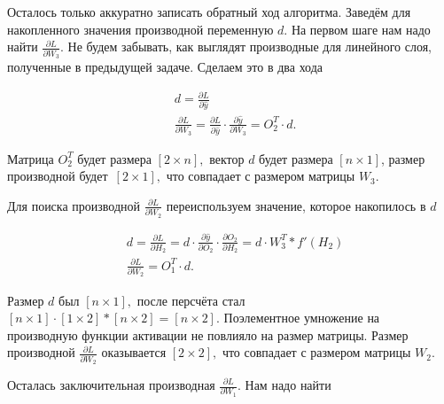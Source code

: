 \begin{sol}
\begin{center}
\end{center}

Осталось только аккуратно записать обратный ход алгоритма. Заведём для накопленного значения производной переменную $d$. На первом шаге нам надо найти $\frac{\partial L}{\partial W_3}$. Не будем забывать, как выглядят производные для линейного слоя, полученные в предыдущей задаче. Сделаем это в два хода

\begin{equation*} 
	\begin{aligned}
		&  d = \frac{\partial L}{\partial \hat y} \\
		&  \frac{\partial L}{\partial W_3} = \frac{\partial L}{\partial \hat y} \cdot \frac{\partial \hat y}{\partial W_3} = O_2^T \cdot d.
	\end{aligned}
\end{equation*}

Матрица $O_2^T$ будет размера $[2 \times n],$ вектор $d$ будет размера $[n \times 1]$, размер производной будет~$[2 \times 1],$ что совпадает с размером матрицы $W_3.$

Для поиска производной $\frac{\partial L}{\partial W_2}$ переиспользуем значение, которое накопилось в $d$

\begin{equation*} 
	\begin{aligned}
		&  d = \frac{\partial L}{\partial H_2} = d \cdot \frac{\partial \hat y}{\partial O_2} \cdot \frac{\partial O_2}{\partial H_2} = d \cdot W_3^T * f'(H_2) \\
		&  \frac{\partial L}{\partial W_2} = O_1^T \cdot d.
	\end{aligned}
\end{equation*}

Размер $d$ был $[n \times 1],$ после персчёта стал $[n \times 1] \cdot [1 \times 2] * [n \times 2] =  [n \times 2].$ Поэлементное умножение на производную функции активации не повлияло на размер матрицы. Размер производной $\frac{\partial L}{\partial W_2}$ оказывается  $[2 \times 2],$ что совпадает с размером матрицы $W_2.$

Осталась заключительная производная $\frac{\partial L}{\partial W_1}$. Нам надо найти 


\end{sol}
